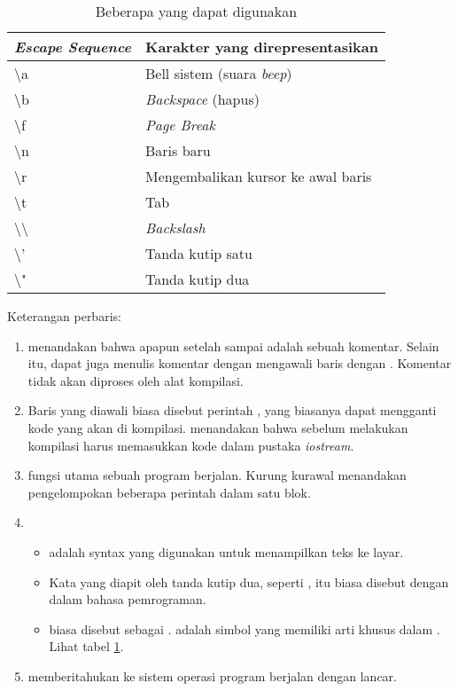 \documentclass[../main.tex]{subfiles}
\begin{document}
\begin{table}
\centering
\begin{tabular}{@{} l l @{}}
  \toprule
  \emph{Escape Sequence}  & Karakter yang direpresentasikan  \\
  \midrule
  \textbackslash{}a    & Bell sistem (suara \emph{beep})\\
  \textbackslash{}b    & \emph{Backspace} (hapus)\\
  \textbackslash{}f    & \emph{Page Break}\\
  \textbackslash{}n    & Baris baru\\
  \textbackslash{}r    & Mengembalikan kursor ke awal baris\\
  \textbackslash{}t    & Tab\\
  \textbackslash{}\textbackslash{}    & \emph{Backslash}\\
  \textbackslash{}'    & Tanda kutip satu\\
  \textbackslash{}"    & Tanda kutip dua\\
  \bottomrule
\end{tabular}
\caption{Beberapa  yang dapat digunakan}
\label{tipe-escape}
\end{table}

Keterangan perbaris:
\begin{enumerate}
  \item \code{/*\ldots*/} menandakan bahwa apapun setelah \code{/*} sampai
  \code{*/} adalah sebuah komentar. Selain itu, dapat juga menulis komentar
  dengan mengawali baris dengan \code{\slash{}\slash{}}.
  Komentar tidak akan diproses oleh alat kompilasi.
  \item Baris yang diawali \code{\#} biasa disebut perintah
  , yang biasanya dapat mengganti kode yang akan
  di kompilasi.  menandakan bahwa sebelum melakukan kompilasi
  harus memasukkan kode dalam pustaka \emph{iostream}.
  \item {} fungsi utama sebuah program berjalan.
  Kurung kurawal menandakan pengelompokan beberapa perintah dalam satu blok.
  \item
  	\begin{itemize}
  	\item {} adalah syntax yang digunakan untuk menampilkan teks
  	  ke layar.
  	\item Kata yang diapit oleh tanda kutip dua, seperti
  	  , itu biasa disebut dengan
  	   dalam bahasa pemrograman.
  	\item {} biasa disebut sebagai
  	  . 
  	  adalah simbol yang memiliki arti khusus dalam .
  	  Lihat tabel \ref{tipe-escape}.
  	\end{itemize}
  \item {} memberitahukan ke sistem operasi program berjalan
  dengan lancar.
\end{enumerate}
\end{document}
